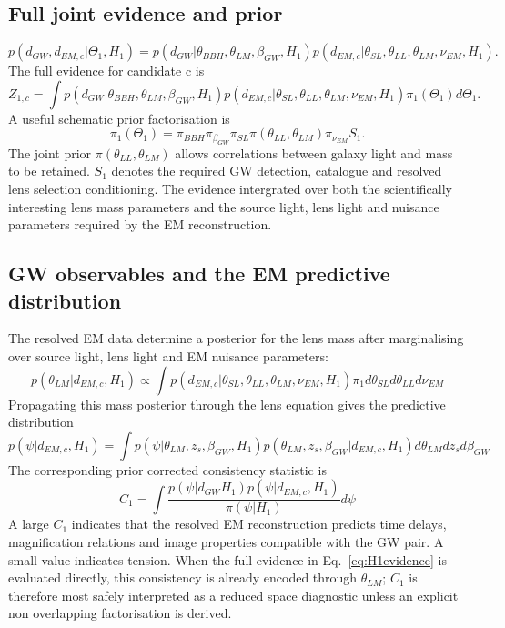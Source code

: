 \documentclass[pdflatex,sn-mathphys-num]{sn-jnl}%
\theoremstyle{thmstyleone}%
\theoremstyle{thmstyletwo}%
\theoremstyle{thmstylethree}%
\begin{document}
\subsection{Full joint evidence and prior}
\begin{equation}
p(d_{GW},d_{EM,c}|\Theta_1,H_1) = p(d_{GW}|\theta_{BBH},\theta_{LM},\beta_{GW},H_1)p(d_{EM,c}|\theta_{SL},\theta_{LL},\theta_{LM},\nu_{EM},H_1).
\end{equation}
The full evidence for candidate c is
\begin{equation}
\label{eq:H1evidence}
Z_{1,c} = \int p(d_{GW}|\theta_{BBH},\theta_{LM},\beta_{GW},H_1)p(d_{EM,c}|\theta_{SL},\theta_{LL},\theta_{LM},\nu_{EM},H_1)\pi_1(\Theta_1)d\Theta_1.
\end{equation}
A useful schematic prior factorisation is
\begin{equation}
\pi_1(\Theta_1)=\pi_{BBH}\pi_{\beta_{GW}}\pi_{SL}\pi(\theta_{LL},\theta_{LM})\pi_{\nu_{EM}}S_1.
\end{equation}
The joint prior $\pi(\theta_{LL},\theta_{LM})$ allows correlations between galaxy light and mass to be retained.
$S_1$ denotes the required GW detection, catalogue and resolved lens selection conditioning.
 The evidence intergrated over both the scientifically interesting lens mass parameters and the source light, lens light and nuisance parameters required by the EM reconstruction.

\subsection{GW observables and the EM predictive distribution}

The resolved EM data determine a posterior for the lens mass after marginalising over source light, lens light and EM nuisance parameters:
\begin{equation}
p(\theta_{LM}|d_{EM,c},H_1) \propto \int p(d_{EM,c}|\theta_{SL},\theta_{LL},\theta_{LM},\nu_{EM},H_1)\pi_1d\theta_{SL}d\theta_{LL}d\nu_{EM}
\end{equation}
Propagating this mass posterior through the lens equation gives the predictive distribution
\begin{equation}
p(\psi|d_{EM,c},H_1) = \int p(\psi|\theta_{LM},z_s,\beta_{GW},H_1)p(\theta_{LM},z_s,\beta_{GW}|d_{EM,c},H_1)d\theta_{LM}dz_sd\beta_{GW}
\end{equation}
The corresponding prior corrected consistency statistic is
\begin{equation}
\label{eq:H1consistency}
C_1 = \int \frac{p(\psi|d_{GW}H_1)p(\psi|d_{EM,c},H_1)}{\pi(\psi|H_1)}d\psi
\end{equation}
A large $C_1$ indicates that the resolved EM reconstruction predicts time delays, magnification relations and image properties compatible with the GW pair.
A small value indicates tension.
When the full evidence in Eq.~\eqref{eq:H1evidence} is evaluated directly, this consistency is already encoded through $\theta_{LM}$; $C_1$ is therefore most safely interpreted as a reduced space diagnostic unless an explicit non overlapping factorisation is derived.
\end{document}
